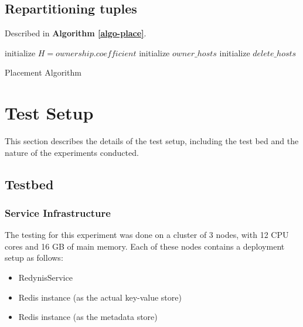 \documentclass{sig-alternate}
\begin{document}
\subsection{Repartitioning tuples}
Described in \textbf{Algorithm \ref{algo-place}}.\\

\begin{algorithm}
\DontPrintSemicolon 
\;
initialize $H = ownership.coefficient$\;
initialize $owner\_hosts$\;
initialize $delete\_hosts$\;
\;

\label{algo-place}
\caption{Placement Algorithm}
\end{algorithm}


\section{Test Setup}
This section describes the details of the test setup, including the test bed and the nature of the experiments conducted.

\subsection{Testbed}

\subsubsection{Service Infrastructure} \label{Service-Infrastructure}
The testing for this experiment was done on a cluster of 3 nodes, with 12 CPU cores and 16 GB of main memory.
Each of these nodes contains a deployment setup as follows:
\begin{itemize}
	\item RedynisService \cite{redynis-svc}
	\item Redis instance (as the actual key-value store)
	\item Redis instance (as the metadata store)
\end{itemize}
\end{document}

